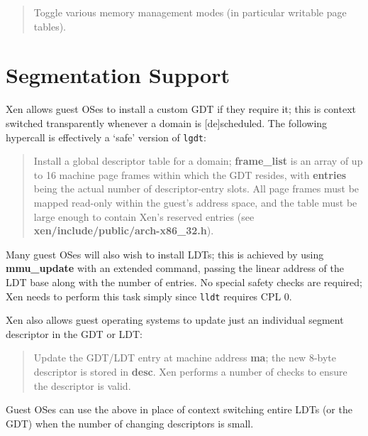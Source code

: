 \documentclass[11pt,twoside,final,openright]{report}
\newcommand{\hypercall}[1]{\vspace{2mm}{\sf #1}}
\begin{document}
\begin{quote} 
\hypercall{vm\_assist(unsigned int cmd, unsigned int type)}

Toggle various memory management modes (in particular writable page
tables).

\end{quote} 

\section{Segmentation Support}

Xen allows guest OSes to install a custom GDT if they require it; 
this is context switched transparently whenever a domain is 
[de]scheduled.  The following hypercall is effectively a 
`safe' version of {\tt lgdt}: 

\begin{quote}
\hypercall{set\_gdt(unsigned long *frame\_list, int entries)} 

Install a global descriptor table for a domain; {\bf frame\_list} is
an array of up to 16 machine page frames within which the GDT resides,
with {\bf entries} being the actual number of descriptor-entry
slots. All page frames must be mapped read-only within the guest's
address space, and the table must be large enough to contain Xen's
reserved entries (see {\bf xen/include/public/arch-x86\_32.h}).

\end{quote}

Many guest OSes will also wish to install LDTs; this is achieved by
using {\bf mmu\_update} with an extended command, passing the
linear address of the LDT base along with the number of entries. No
special safety checks are required; Xen needs to perform this task
simply since {\tt lldt} requires CPL 0.


Xen also allows guest operating systems to update just an 
individual segment descriptor in the GDT or LDT:  

\begin{quote}
\hypercall{update\_descriptor(uint64\_t ma, uint64\_t desc)}

Update the GDT/LDT entry at machine address {\bf ma}; the new
8-byte descriptor is stored in {\bf desc}.
Xen performs a number of checks to ensure the descriptor is 
valid. 

\end{quote}

Guest OSes can use the above in place of context switching entire 
LDTs (or the GDT) when the number of changing descriptors is small. 
\end{document}
